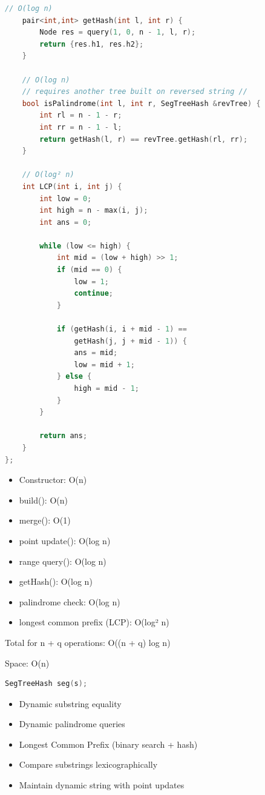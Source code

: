 \begin{lstlisting}[language=C++]
    // O(log n)
    pair<int,int> getHash(int l, int r) {
        Node res = query(1, 0, n - 1, l, r);
        return {res.h1, res.h2};
    }

    // O(log n)
    // requires another tree built on reversed string //
    bool isPalindrome(int l, int r, SegTreeHash &revTree) {
        int rl = n - 1 - r;
        int rr = n - 1 - l;
        return getHash(l, r) == revTree.getHash(rl, rr);
    }

    // O(log² n)
    int LCP(int i, int j) {
        int low = 0;
        int high = n - max(i, j);
        int ans = 0;

        while (low <= high) {
            int mid = (low + high) >> 1;
            if (mid == 0) {
                low = 1;
                continue;
            }

            if (getHash(i, i + mid - 1) ==
                getHash(j, j + mid - 1)) {
                ans = mid;
                low = mid + 1;
            } else {
                high = mid - 1;
            }
        }

        return ans;
    }
};
\end{lstlisting}


\begin{itemize}
    \item Constructor: O(n)
    \item build(): O(n)
    \item merge(): O(1)
    \item point update(): O(log n)
    \item range query(): O(log n)
    \item getHash(): O(log n)
    \item palindrome check: O(log n)
    \item longest common prefix (LCP): O(log² n)
\end{itemize}

Total for n + q operations: O((n + q) log n)

Space: O(n)

\begin{lstlisting}[language=C++]
SegTreeHash seg(s);
\end{lstlisting}


\begin{itemize}
    \item Dynamic substring equality
    \item Dynamic palindrome queries
    \item Longest Common Prefix (binary search + hash)
    \item Compare substrings lexicographically
    \item Maintain dynamic string with point updates
\end{itemize}

